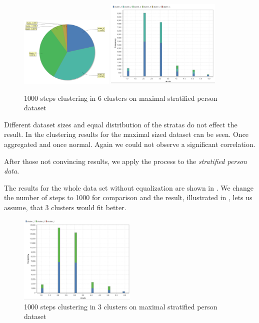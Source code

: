 \begin{figure}[H]
	\centering
	\includegraphics[width=0.4\textwidth]{vectorclusteringcluster1000.PNG}
	\includegraphics[width=0.49\textwidth]{vectorClustering1000.PNG}
	\caption{1000 steps clustering in 6 clusters on maximal stratified person dataset}
	\label{fig:1000vect}
\end{figure}
\vspace*{-2em}

Different dataset sizes and equal distribution of the stratas do not effect the result. In   the clustering results for the maximal sized dataset can be seen. Once aggregated and once normal. Again we could not observe a significant correlation.

After those not convincing results, we apply the process to the \textit{stratified person data}.



The results for the whole data set without equalization are shown in . We change the number of steps to 1000 for comparison and the result, illustrated in , lets us assume, that 3 clusters would fit better. 


\begin{figure}[H]
\centering
\includegraphics[width=0.5\textwidth]{vectorClustering31000.PNG}
\caption{1000 steps clustering in 3 clusters on maximal stratified person dataset}
\label{fig:1000vect3}
\end{figure}

